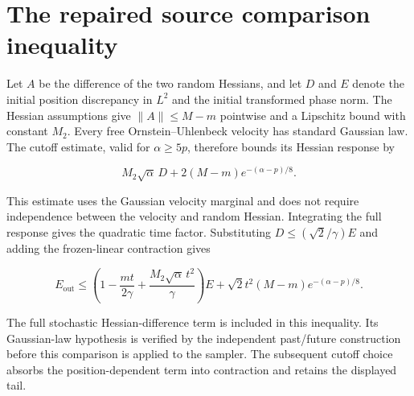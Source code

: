 \documentclass[11pt,a4paper]{article}
\begin{document}
\section{\texorpdfstring{The repaired source comparison inequality}{The repaired source comparison inequality}}


Let \(A\) be the difference of the two random Hessians, and let \(D\) and \(E\) denote the initial position discrepancy in \(L^2\) and the initial transformed phase norm. The Hessian assumptions give \(\|A\|\le M-m\) pointwise and a Lipschitz bound with constant \(M_2\). Every free Ornstein–Uhlenbeck velocity has standard Gaussian law. The cutoff estimate, valid for \(\alpha\ge5p\), therefore bounds its Hessian response by

\[M_2\sqrt\alpha\,D+2(M-m)e^{-(\alpha-p)/8}.\]

This estimate uses the Gaussian velocity marginal and does not require independence between the velocity and random Hessian. Integrating the full response gives the quadratic time factor. Substituting \(D\le(\sqrt2/\gamma)E\) and adding the frozen-linear contraction gives

\[E_{\mathrm{out}}\le\left(1-\frac{mt}{2\gamma}+\frac{M_2\sqrt\alpha\,t^2}{\gamma}\right)E+\sqrt2t^2(M-m)e^{-(\alpha-p)/8}.\]

The full stochastic Hessian-difference term is included in this inequality. Its Gaussian-law hypothesis is verified by the independent past/\allowbreak{}future construction before this comparison is applied to the sampler. The subsequent cutoff choice absorbs the position-dependent term into contraction and retains the displayed tail.
\end{document}
